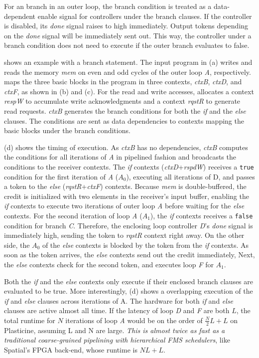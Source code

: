 For an branch in an outer loop,
the branch condition is treated as a data-dependent enable signal for controllers under the branch clauses.
If the controller is disabled, its \emph{done} signal raises to high immediately.
Output tokens depending on the {\em done} signal will be immediately sent out.
This way, the controller under a branch condition does not need to execute if the outer branch
evaluates to false.

 shows an example with a branch statement.
The input program in (a) writes and reads the memory \emph{mem} on even and odd cycles of
the outer loop \emph{A}, respectively. 
\name maps the three basic blocks in the program in three
contexts, \emph{ctxB}, \emph{ctxD}, and \emph{ctxF}, as shown in (b) and (c). 
For the read and write accesses, \name
allocates a context \emph{respW} to accumulate write acknowledgments and a context \emph{rqstR} 
to generate read requests. 
\emph{ctxB} generates the branch conditions for both the \emph{if} and the \emph{else} clauses.
The conditions are sent as data dependencies to contexts mapping the basic blocks under the branch conditions.

 (d) shows the timing of execution.
As \emph{ctxB} has no dependencies, \emph{ctxB} computes the conditions for all iterations of
\emph{A} in
pipelined fashion and broadcasts the conditions to the receiver contexts.
The \emph{if} contexts (\emph{ctxD}+\emph{rspdW}) receives a \texttt{true} condition for the first
iteration of \emph{A} ($A_0$), 
executing all iterations of D, and passes a token to the \emph{else} (\emph{rqstR}+\emph{ctxF}) contexts.
Because \emph{mem} is double-buffered, the credit is initialized with two elements in the
receiver's input buffer, enabling the \emph{if} contexts to execute two iterations of outer loop
\emph{A} before
waiting for the \emph{else} contexts. For the second iteration of loop \emph{A} ($A_1$), the \emph{if} contexts
receives a \texttt{false} condition for branch \emph{C}.
Therefore, the enclosing loop controller \emph{D}'s \emph{done} signal is immediately high, sending the
token to \emph{rqstR} context right away.
On the other side, the $A_0$ of the \emph{else} contexts is blocked by the token from
the \emph{if} contexts. 
As soon as the token arrives, the \emph{else} contexts send out the credit immediately,
Next, the \emph{else} contexts check for the second token, 
and executes loop \emph{F} for $A_1$.

Both the \emph{if} and the \emph{else} contexts only execute if their enclosed branch clauses are
evaluated to be true. More interestingly,  (d) shows a overlapping execution of the
\emph{if} and \emph{else} clauses across iterations of A. 
The hardware for both \emph{if} and \emph{else} clauses are active almost all time.
If the latency of loop \emph{D} and \emph{F} are both $L$, 
the total runtime for $N$ iterations of loop \emph{A} would be on the order of $\frac{N}{2}L+L$
on Plasticine, assuming L and N are large.
\emph{This is almost twice as fast as a traditional coarse-grained pipelining with hierarchical FMS
schedulers}, like Spatial's FPGA back-end, whose runtime is $NL+L$.

